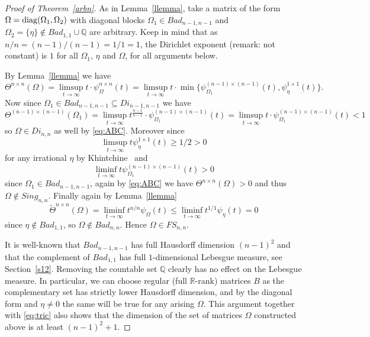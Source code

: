 \documentclass[10pt]{amsart}
\theoremstyle{definition}
\newcommand{\R}{\mathbb{R}}
\newcommand{\Q}{\mathbb{Q}}
\begin{document}
\begin{proof}[Proof of Theorem~\ref{arbn}]
    As in  Lemma~\ref{llemma}, take a matrix of the form $\Omega=\rm{diag}(\Omega_1, \Omega_2)$ with diagonal
    blocks $\Omega_1\in Bad_{n-1,n-1}$ and
    $\Omega_2=\{\eta\}\notin Bad_{1,1}\cup \Q$ are arbitrary. 
    Keep in mind that as $n/n=(n-1)/(n-1)=1/1=1$, the Dirichlet exponent (remark: not constant) 
    is $1$ for all $\Omega_1$, $\eta$ and $\Omega$, for all arguments below.

    By Lemma~\ref{llemma} we have
    \begin{equation} \label{eq:ABC}
    \Theta^{n\times n}(\Omega) =
    \limsup_{t\to\infty} 
    t \cdot \psi_{\Omega}^{n\times n}(t)
    = \limsup_{t\to\infty} 
    t \cdot \min \{ \psi_{\Omega_1}^{(n-1)\times (n-1)}(t), \psi_{\eta}^{1\times 1}(t)\}.
    \end{equation}
    Now since $\Omega_1\in Bad_{n-1,n-1}\subseteq Di_{n-1,n-1}$ we have
    \[
    \Theta^{(n-1)\times (n-1)}(\Omega_1)=
    \limsup_{t\to\infty} 
    t^{\frac{n-1}{n-1}} \cdot \psi_{\Omega_1}^{(n-1)\times (n-1)}(t)=\limsup_{t\to\infty} 
    t \cdot \psi_{\Omega_1}^{(n-1)\times (n-1)}(t) < 1
    \]
    so $\Omega\in Di_{n,n}$ as well by \eqref{eq:ABC}. 
    Moreover since 
    \[
    \limsup_{t\to\infty} t\psi^{1\times 1}_{\eta}(t)\ge 1/2>0
    \]
    for any irrational $\eta$ by Khintchine~\cite{Khinchin3} and
    \[
     \liminf_{t\to\infty} t\psi_{\Omega_1}^{(n-1)\times (n-1)}(t)
    >0
    \]
    since $\Omega_1\in Bad_{n-1,n-1}$, again by \eqref{eq:ABC} we have 
    $\Theta^{n\times n}(\Omega)>0$ and thus $\Omega\notin Sing_{n,n}$.
    Finally again by Lemma~\ref{llemma}
    \[
    \tilde{\Theta}^{n\times n}(\Omega)=\liminf_{t\to\infty} t^{n/n} \psi_{\Omega}(t) \le 
    \liminf_{t\to\infty} t^{1/1} \psi_{\eta}(t) = 0
    \]
    since $\eta\notin Bad_{1,1}$, so $\Omega\notin Bad_{n,n}$. Hence
    $\Omega\in FS_{n,n}$.

    It is well-known that $Bad_{n-1,n-1}$ has full Hausdorff dimension $(n-1)^2$ and
    that the complement
    of $Bad_{1,1}$ has full $1$-dimensional Lebesgue measure,
    see Section~\ref{s12}. Removing the countable set $\Q$ clearly has no effect on the Lebesgue measure.
    In particular, we can choose regular (full $\R$-rank) matrices $B$ as the complementary set
    has strictly lower Hausdorff dimension, and by the diagonal form
    and $\eta\ne 0$ the same will be true for any arising $\Omega$.
    This argument together with \eqref{eq:tric} also shows that the dimension of the set of matrices $\Omega$ constructed above is at least $(n-1)^2+1$.
\end{proof}
\end{document}
